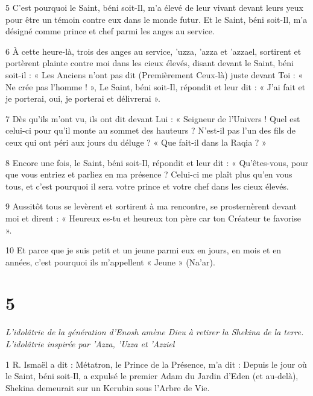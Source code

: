 \par 5 C'est pourquoi le Saint, béni soit-Il, m'a élevé de leur vivant devant leurs yeux pour être un témoin contre eux dans le monde futur. Et le Saint, béni soit-Il, m'a désigné comme prince et chef parmi les anges au service.

\par 6 À cette heure-là, trois des anges au service, 'uzza, 'azza et 'azzael, sortirent et portèrent plainte contre moi dans les cieux élevés, disant devant le Saint, béni soit-il : « Les Anciens n'ont pas dit (Premièrement Ceux-là) juste devant Toi : « Ne crée pas l'homme ! », Le Saint, béni soit-Il, répondit et leur dit : « J'ai fait et je porterai, oui, je porterai et délivrerai ».

\par 7 Dès qu'ils m'ont vu, ils ont dit devant Lui : « Seigneur de l'Univers ! Quel est celui-ci pour qu'il monte au sommet des hauteurs ? N'est-il pas l'un des fils de ceux qui ont péri aux jours du déluge ? « Que fait-il dans la Raqia ? »

\par 8 Encore une fois, le Saint, béni soit-Il, répondit et leur dit : « Qu'êtes-vous, pour que vous entriez et parliez en ma présence ? Celui-ci me plaît plus qu'en vous tous, et c'est pourquoi il sera votre prince et votre chef dans les cieux élevés.

\par 9 Aussitôt tous se levèrent et sortirent à ma rencontre, se prosternèrent devant moi et dirent : « Heureux es-tu et heureux ton père car ton Créateur te favorise ».

\par 10 Et parce que je suis petit et un jeune parmi eux en jours, en mois et en années, c'est pourquoi ils m'appellent « Jeune » (Na'ar).

\chapter{5}

\par \textit{L'idolâtrie de la génération d'Enosh amène Dieu à retirer la Shekina de la terre. L'idolâtrie inspirée par 'Azza, 'Uzza et 'Azziel}

\par 1 R. Ismaël a dit : Métatron, le Prince de la Présence, m'a dit : Depuis le jour où le Saint, béni soit-Il, a expulsé le premier Adam du Jardin d'Eden (et au-delà), Shekina demeurait sur un Kerubin sous l'Arbre de Vie.

